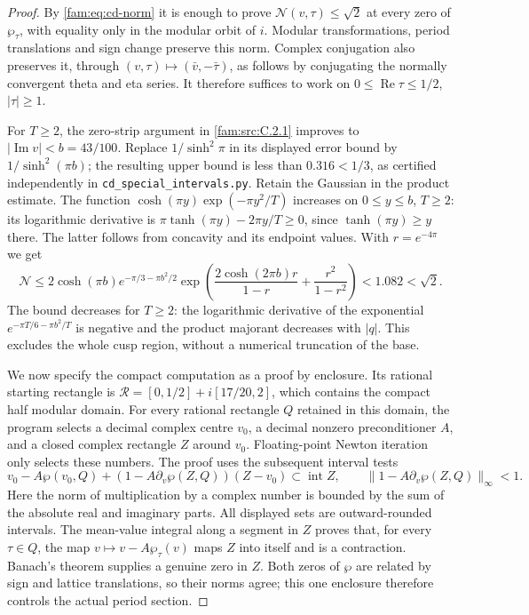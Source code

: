 \begin{proof}
By \eqref{fam:eq:cd-norm} it is enough to prove
$\mathcal N(v,\tau)\leq\sqrt2$ at every zero of $\wp_\tau$, with equality
only in the modular orbit of $i$. Modular transformations, period
translations and sign change preserve this norm. Complex conjugation
also preserves it, through
$(v,\tau)\mapsto(\bar v,-\bar\tau)$, as follows by conjugating the
normally convergent theta and eta series. It therefore suffices to work
on $0\leq\operatorname{Re}\tau\leq1/2$, $|\tau|\geq1$.

For $T\geq2$, the zero-strip argument in \ref{fam:src:C.2.1} improves to
$|\operatorname{Im}v|<b=43/100$. Replace $1/\sinh^2\pi$ in its displayed
error bound by $1/\sinh^2(\pi b)$; the resulting upper bound is less
than $0.316<1/3$, as certified independently in
\texttt{cd\_special\_intervals.py}. Retain the Gaussian in the product
estimate. The function
$\cosh(\pi y)\exp(-\pi y^2/T)$ increases on $0\leq y\leq b$, $T\geq2$:
its logarithmic derivative is $\pi\tanh(\pi y)-2\pi y/T\geq0$, since
$\tanh(\pi y)\geq y$ there. The latter follows from concavity and its
endpoint values. With $r=e^{-4\pi}$ we get
\[
 \mathcal N\leq
 2\cosh(\pi b)e^{-\pi/3-\pi b^2/2}
 \exp\left(\frac{2\cosh(2\pi b)r}{1-r}+
                  \frac{r^2}{1-r^2}\right)
 <1.082<\sqrt2.
\]
The bound decreases for $T\geq2$: the logarithmic derivative of the
exponential $e^{-\pi T/6-\pi b^2/T}$ is negative and the product
majorant decreases with $|q|$. This excludes the whole cusp region,
without a numerical truncation of the base.

We now specify the compact computation as a proof by enclosure.
Its rational starting rectangle is
$\mathcal R=[0,1/2]+i[17/20,2]$, which contains the compact half modular
domain. For every rational rectangle $Q$ retained in this domain, the
program selects a decimal complex centre $v_0$, a decimal nonzero
preconditioner $A$, and a closed complex rectangle $Z$ around $v_0$.
Floating-point Newton iteration only selects these numbers. The proof
uses the subsequent interval tests
\[
 v_0-A\wp(v_0,Q)+(1-A\partial_v\wp(Z,Q))(Z-v_0)
       \subset\operatorname{int}Z,
 \qquad
 \|1-A\partial_v\wp(Z,Q)\|_\infty<1.
\]
Here the norm of multiplication by a complex number is bounded by the
sum of the absolute real and imaginary parts. All displayed sets are
outward-rounded intervals. The mean-value integral along a segment in
$Z$ proves that, for every $\tau\in Q$, the map
$v\mapsto v-A\wp_\tau(v)$ maps $Z$ into itself and is a contraction.
Banach's theorem supplies a genuine zero in $Z$. Both zeros of $\wp$
are related by sign and lattice translations, so their norms agree;
this one enclosure therefore controls the actual period section.


\end{proof}

